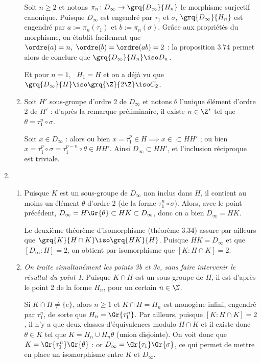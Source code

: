 \begin{enumerate}[1)]
\begin{enumerate}
    Soit $n\geqslant 2$ et  notons $\pi_n\colon D_{\infty}\to \grq{D_{\infty}}{H_n}$ le morphisme surjectif canonique. Puisque $D_{\infty}$ est engendré par $\tau_1$ et $\sigma$, $\grq{D_{\infty}}{H_n}$ est 
    engendré par $a:= \pi_n(\tau_1)$ et $b:=\pi_n(\sigma)$. Grâce aux propriétés du morphisme, on établit facilement que $\ordre(a) = n,~ \ordre(b) = \ordre(ab) = 2$ : la proposition 3.74 permet alors 
    de conclure que $\grq{D_{\infty}}{H_n} \iso D_n$.\medskip

    Et pour $n=1$,~ $H_1 = H$ et on a déjà vu que $\grq{D_{\infty}}{H}\iso \grq{\Z}{2\Z} \iso C_2$.
    \item Soit $H'$ sous-groupe d'ordre 2 de $D_{\infty}$ et notons $\theta$ l'unique élément d'ordre 2 de $H'$ : d'après la remarque préliminaire, il existe $n\in \Z^*$ tel que $\theta = \tau_1^n\circ \sigma$.
    
    Soit $x\in D_{\infty}$ : alors ou bien $x = \tau_1^p \in H \implies x\in \subset HH'$ ; ou bien $x=\tau_1^p \circ \sigma = \tau_1^{p-n} \circ \theta \in HH'$. Ainsi $D_{\infty}\subset HH'$, et l'inclusion réciproque est triviale.
\end{enumerate}

\item \begin{enumerate}
    \item Puisque $K$ est un sous-groupe de $D_{\infty}$ non inclus dans $H$, il contient au moins un élément $\theta$ d'ordre 2 (de la forme $\tau_1^n\circ \sigma$). 
    Alors, avec le point précédent, $D_{\infty} = H\Gr{\theta} \subset HK \subset D_{\infty}$, donc on a bien $D_{\infty} = HK$.
    
    Le deuxième théorème d'isomorphisme (théorème 3.34) assure par ailleurs que $\grq{K}{H\cap K} \iso \grq{HK}{H}$. Puisque $HK=D_{\infty}$ et que $[D_{\infty}:H] = 2$, on obtient par isomorphisme que $[K:H\cap K] = 2$.
    
    \item \emph{On traite simultanément les points 3b et 3c, sans faire intervenir le résultat du point 1}. Puisque $K\cap H$ est un sous-groupe de $H$, il est d'après le point 2 de la forme $H_n$, pour un certain $n\in \N$.
    
    Si $K\cap H\neq \{e\}$, alors $n\geqslant 1$ et $K\cap H = H_n$ est monogène infini, engendré par $\tau_1^n$, de sorte que $H_n = \Gr{\tau_1^n}$. Par ailleurs, puisque  $[K:H\cap K] = 2$, il n'y a que deux classes d'équivalences modulo $H\cap K$ 
    et il existe donc $\theta \in K$ tel que $K = H_n \cup H_n \theta$ (union disjointe). On voit donc que $K = \Gr{\tau_1^n}\Gr{\theta}$ : or $D_{\infty}=\Gr{\tau_1}\Gr{\sigma}$, ce qui permet de mettre en place 
    un isomorphisme entre $K$ et $D_{\infty}$.


\end{enumerate}
\end{enumerate}
